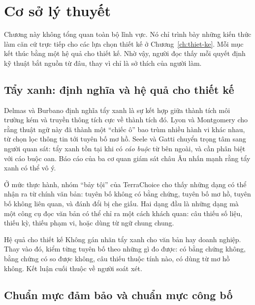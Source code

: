 \chapter{Cơ sở lý thuyết}\label{ch:co-so}

Chương này không tổng quan toàn bộ lĩnh vực. Nó chỉ trình bày những kiến thức làm căn cứ trực tiếp cho các lựa chọn thiết kế ở Chương~\ref{ch:thiet-ke}. Mỗi mục kết thúc bằng một hệ quả cho thiết kế. Nhờ vậy, người đọc thấy mỗi quyết định kỹ thuật bắt nguồn từ đâu, thay vì chỉ là sở thích của người làm.

\section{Tẩy xanh: định nghĩa và hệ quả cho thiết kế}

Delmas và Burbano \cite{delmas2011} định nghĩa tẩy xanh là sự kết hợp giữa thành tích môi trường kém và truyền thông tích cực về thành tích đó. Lyon và Montgomery \cite{lyon2015} cho rằng thuật ngữ này đã thành một “chiếc ô” bao trùm nhiều hành vi khác nhau, từ chọn lọc thông tin tới tuyên bố mơ hồ. Seele và Gatti \cite{seele2017} chuyển trọng tâm sang người quan sát: tẩy xanh tồn tại khi có \emph{cáo buộc} từ bên ngoài, và cần phân biệt với cáo buộc oan. Báo cáo của ba cơ quan giám sát châu Âu \cite{esas2024} nhấn mạnh rằng tẩy xanh có thể vô ý.

Ở mức thực hành, nhóm “bảy tội” của TerraChoice \cite{terrachoice2009} cho thấy những dạng có thể nhận ra từ chính văn bản: tuyên bố không có bằng chứng, tuyên bố mơ hồ, tuyên bố không liên quan, và đánh đổi bị che giấu. Hai dạng đầu là những dạng mà một công cụ đọc văn bản có thể chỉ ra một cách khách quan: câu thiếu số liệu, thiếu kỳ, thiếu phạm vi, hoặc dùng từ ngữ chung chung.

\begin{hopy}{Hệ quả cho thiết kế}
Không gán nhãn tẩy xanh cho văn bản hay doanh nghiệp. Thay vào đó, kiểm từng tuyên bố theo những gì đo được: có bằng chứng không, bằng chứng có so được không, câu thiếu thuộc tính nào, có dùng từ mơ hồ không. Kết luận cuối thuộc về người soát xét.
\end{hopy}

\section{Chuẩn mực đảm bảo và chuẩn mực công bố}

